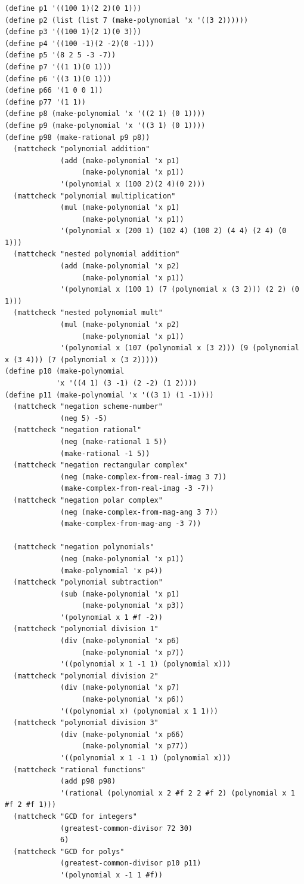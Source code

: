 \documentclass[final,fleqn,titlepage,twoside]{article}
\begin{document}
\begin{verbatim}
(define p1 '((100 1)(2 2)(0 1)))
(define p2 (list (list 7 (make-polynomial 'x '((3 2))))))
(define p3 '((100 1)(2 1)(0 3)))
(define p4 '((100 -1)(2 -2)(0 -1)))
(define p5 '(8 2 5 -3 -7))
(define p7 '((1 1)(0 1)))
(define p6 '((3 1)(0 1)))
(define p66 '(1 0 0 1))
(define p77 '(1 1))
(define p8 (make-polynomial 'x '((2 1) (0 1))))
(define p9 (make-polynomial 'x '((3 1) (0 1))))
(define p98 (make-rational p9 p8))
  (mattcheck "polynomial addition"
             (add (make-polynomial 'x p1)
                  (make-polynomial 'x p1))
             '(polynomial x (100 2)(2 4)(0 2)))
  (mattcheck "polynomial multiplication"
             (mul (make-polynomial 'x p1)
                  (make-polynomial 'x p1))
             '(polynomial x (200 1) (102 4) (100 2) (4 4) (2 4) (0 1)))
  (mattcheck "nested polynomial addition"
             (add (make-polynomial 'x p2)
                  (make-polynomial 'x p1))
             '(polynomial x (100 1) (7 (polynomial x (3 2))) (2 2) (0 1)))
  (mattcheck "nested polynomial mult"
             (mul (make-polynomial 'x p2)
                  (make-polynomial 'x p1))
             '(polynomial x (107 (polynomial x (3 2))) (9 (polynomial x (3 4))) (7 (polynomial x (3 2)))))
(define p10 (make-polynomial
            'x '((4 1) (3 -1) (2 -2) (1 2))))
(define p11 (make-polynomial 'x '((3 1) (1 -1))))
  (mattcheck "negation scheme-number"
             (neg 5) -5)
  (mattcheck "negation rational"
             (neg (make-rational 1 5))
             (make-rational -1 5))
  (mattcheck "negation rectangular complex"
             (neg (make-complex-from-real-imag 3 7))
             (make-complex-from-real-imag -3 -7))
  (mattcheck "negation polar complex"
             (neg (make-complex-from-mag-ang 3 7))
             (make-complex-from-mag-ang -3 7))

  (mattcheck "negation polynomials"
             (neg (make-polynomial 'x p1))
             (make-polynomial 'x p4))
  (mattcheck "polynomial subtraction"
             (sub (make-polynomial 'x p1)
                  (make-polynomial 'x p3))
             '(polynomial x 1 #f -2))
  (mattcheck "polynomial division 1"
             (div (make-polynomial 'x p6)
                  (make-polynomial 'x p7))
             '((polynomial x 1 -1 1) (polynomial x)))
  (mattcheck "polynomial division 2"
             (div (make-polynomial 'x p7)
                  (make-polynomial 'x p6))
             '((polynomial x) (polynomial x 1 1)))
  (mattcheck "polynomial division 3"
             (div (make-polynomial 'x p66)
                  (make-polynomial 'x p77))
             '((polynomial x 1 -1 1) (polynomial x)))
  (mattcheck "rational functions"
             (add p98 p98)
             '(rational (polynomial x 2 #f 2 2 #f 2) (polynomial x 1 #f 2 #f 1)))
  (mattcheck "GCD for integers"
             (greatest-common-divisor 72 30)
             6)
  (mattcheck "GCD for polys"
             (greatest-common-divisor p10 p11)
             '(polynomial x -1 1 #f))
\end{verbatim}
\end{document}
